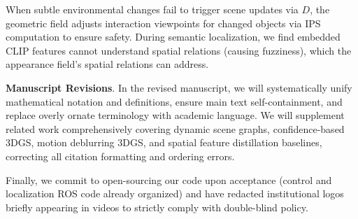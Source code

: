 \documentclass[conference]{IEEEtran}
\begin{document}
When subtle environmental changes fail to trigger scene updates via $D$, the geometric field adjusts interaction viewpoints for changed objects via IPS computation to ensure safety. During semantic localization, we find embedded CLIP features cannot understand spatial relations (causing fuzziness), which the appearance field's spatial relations can address.

\textbf{Manuscript Revisions}. In the revised manuscript, we will systematically unify mathematical notation and definitions, ensure main text self-containment, and replace overly ornate terminology with academic language. We will supplement related work comprehensively covering dynamic scene graphs, confidence-based 3DGS, motion deblurring 3DGS, and spatial feature distillation baselines, correcting all citation formatting and ordering errors.

Finally, we commit to open-sourcing our code upon acceptance (control and localization ROS code already organized) and have redacted institutional logos briefly appearing in videos to strictly comply with double-blind policy.
\end{document}
